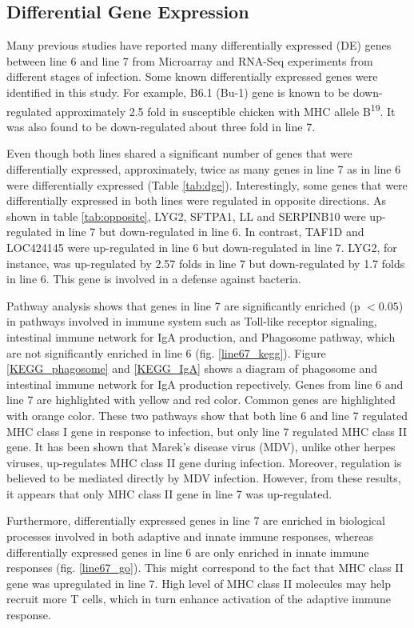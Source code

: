 \documentclass[10pt]{article}
\begin{document}
\subsection*{Differential Gene Expression}
Many previous studies have reported many differentially expressed (DE) genes between line 6 and line 7
from Microarray and RNA-Seq experiments from different stages of infection.
Some known differentially expressed genes were identified in this study.
For example, B6.1 (Bu-1) gene is known to be down-regulated approximately 2.5 fold in susceptible
chicken with MHC allele B\textsuperscript{19}\cite{}. It was also found to be down-regulated
about three fold in line 7.

Even though both lines shared a significant number of genes that were differentially expressed,
approximately, twice as many genes in line 7 as in line 6 were differentially expressed (Table \ref{tab:dge}).
Interestingly, some genes that were differentially expressed in both lines were
regulated in opposite directions.
As shown in table \ref{tab:opposite}, LYG2, SFTPA1, LL and SERPINB10 were up-regulated in line 7 but down-regulated in line 6.
In contrast, TAF1D and LOC424145 were up-regulated in line 6 but down-regulated in line 7.
LYG2, for instance, was up-regulated by 2.57 folds in line 7 but down-regulated by 1.7 folds in line 6.
This gene is involved in a defense against bacteria.

Pathway analysis shows that genes in line 7 are significantly enriched (p $< 0.05$) in pathways involved in
immune system such as Toll-like receptor signaling, intestinal immune network for IgA production,
and Phagosome pathway, which are not significantly enriched in line 6 (fig. \ref{line67_kegg}).
Figure \ref{KEGG_phagosome} and \ref{KEGG_IgA} shows a diagram of phagosome and intestinal immune network
for IgA production repectively. Genes from line 6 and line 7 are highlighted with yellow and red color.
Common genes are highlighted with orange color.
These two pathways show that both line 6 and line 7 regulated MHC class I gene in response to infection,
but only line 7 regulated MHC class II gene.
It has been shown that Marek's disease virus (MDV), unlike other herpes viruses, up-regulates MHC class II gene
during infection. Moreover, regulation is believed to be mediated directly by MDV infection\cite{Niikura:2007fq}.
However, from these results, it appears that only MHC class II gene in line 7 was up-regulated.

Furthermore, differentially expressed genes in line 7 are enriched in biological processes involved in
both adaptive and innate immune responses, whereas
differentially expressed genes in line 6 are only enriched in innate immune responses (fig. \ref{line67_go}).
This might correspond to the fact that MHC class II gene was upregulated in line 7.
High level of MHC class II molecules may help recruit more T cells, which in turn enhance activation of
the adaptive immune response.
\end{document}
